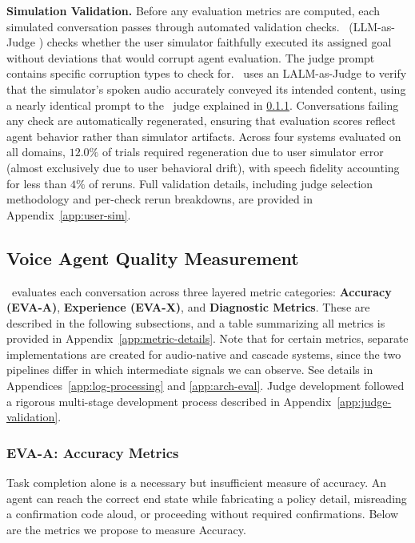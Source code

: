 \textbf{Simulation Validation.} Before any evaluation metrics are computed, each simulated conversation passes through automated validation checks. \metricbehavior~(LLM-as-Judge \citep{NEURIPS2023_91f18a12}) checks whether the user simulator faithfully executed its assigned goal without deviations that would corrupt agent evaluation. The judge prompt contains specific corruption types to check for. \metricuserspeechfidelity~uses an LALM-as-Judge to verify that the simulator's spoken audio accurately conveyed its intended content, using a nearly identical prompt to the \metricfidelity~judge explained in \ref{accuracy-metrics}. Conversations failing any check are automatically regenerated, ensuring that evaluation scores reflect agent behavior rather than simulator artifacts. Across four systems evaluated on all domains, $12.0\%$ of trials required regeneration due to user simulator error (almost exclusively due to user behavioral drift), with speech fidelity accounting for less than $4\%$ of reruns. Full validation details, including judge selection methodology and per-check rerun breakdowns, are provided in Appendix~\ref{app:user-sim}.



\subsection{Voice Agent Quality Measurement}

\framework~evaluates each conversation across three layered metric categories: \textbf{Accuracy (EVA-A)}, \textbf{Experience (EVA-X)}, and \textbf{Diagnostic Metrics}. These are described in the following subsections, and a table summarizing all metrics is provided in Appendix~\ref{app:metric-details}. Note that for certain metrics, separate implementations are created for audio-native and cascade systems,  since the two pipelines differ in which intermediate signals we can observe. See details in Appendices~\ref{app:log-processing} and \ref{app:arch-eval}. Judge development followed a rigorous multi-stage development process described in Appendix~\ref{app:judge-validation}.


\subsubsection{EVA-A: Accuracy Metrics}
\label{accuracy-metrics}

Task completion alone is a necessary but insufficient measure of 
accuracy. An agent can reach the correct end state while fabricating a 
policy detail, misreading a confirmation code aloud, or proceeding 
without required confirmations. Below are the metrics we propose to measure Accuracy.

